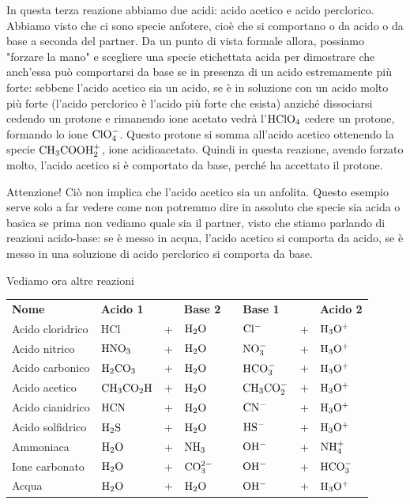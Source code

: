 \vspace{0.2cm}In questa terza reazione abbiamo due acidi: acido acetico e acido perclorico. Abbiamo visto che ci sono specie anfotere, cioè che si comportano o da acido o da base a seconda del partner. Da un punto di vista formale allora, possiamo "forzare la mano" e scegliere una specie etichettata acida per dimostrare che anch'essa può comportarsi da base se in presenza di un acido estremamente più forte: sebbene l'acido acetico sia un acido, se è in soluzione con un acido molto più forte (l'acido perclorico è l'acido più forte che esista) anziché dissociarsi cedendo un protone e rimanendo ione acetato vedrà l'$\rm HClO_4$ cedere un protone, formando lo ione $\rm ClO_4^-$. Questo protone si somma all'acido acetico ottenendo la specie $\rm CH_3COOH_2^+$, ione acidioacetato. Quindi in questa reazione, avendo forzato molto, l'acido acetico si è comportato da base, perché ha accettato il protone.

Attenzione! Ciò non implica che l'acido acetico sia un anfolita. Questo esempio serve solo a far vedere come non potremmo dire in assoluto che specie sia acida o basica se prima non vediamo quale sia il partner, visto che stiamo parlando di reazioni acido-base: se è messo in acqua, l'acido acetico si comporta da acido, se è messo in una soluzione di acido perclorico si comporta da base.

\vspace{0.2cm}Vediamo ora altre reazioni

\begin{center}
    \begin{tabular}{llllllll}
        \textbf{Nome} & \textbf{Acido 1} & & \textbf{Base 2} & & \textbf{Base 1} & & \textbf{Acido 2}\\[0.3ex]
        Acido cloridrico & HCl & + & $\rm H_2O$ & \ce{<-->} & $\rm Cl^-$ & + & $\rm H_3O^+$\\[0.3ex]
        Acido nitrico & $\rm HNO_3$ & + & $\rm H_2O$ & \ce{<-->} & $\rm NO_3^-$ & + & $\rm H_3O^+$\\[0.3ex]
        Acido carbonico & $\rm H_2CO_3$ & + & $\rm H_2O$ & \ce{<-->} & $\rm HCO_3^-$ & + & $\rm H_3O^+$\\[0.3ex]
        Acido acetico & $\rm CH_3CO_2H$ & + & $\rm H_2O$ & \ce{<-->} & $\rm CH_3CO_2^-$ & + & $\rm H_3O^+$\\[0.3ex]
        Acido cianidrico & $\rm HCN$ & + & $\rm H_2O$ & \ce{<-->} & $\rm CN^-$ & + & $\rm H_3O^+$\\[0.3ex]
        Acido solfidrico & $\rm H_2S$ & + & $\rm H_2O$ & \ce{<-->} & $\rm HS^-$ & + & $\rm H_3O^+$\\[0.3ex]
        Ammoniaca & $\rm H_2O$ & + & $\rm NH_3$ & \ce{<-->} & $\rm OH^-$ & + & $\rm NH_4^+$\\[0.3ex]
        Ione carbonato & $\rm H_2O$ & + & $\rm CO_3^{2-}$ & \ce{<-->} & $\rm OH^-$ & + & $\rm HCO_3^-$\\[0.3ex]
        Acqua & $\rm H_2O$ & + & $\rm H_2O$ & \ce{<-->} & $\rm OH^-$ & + & $\rm H_3O^+$\\[0.3ex]
    \end{tabular}
\end{center}

